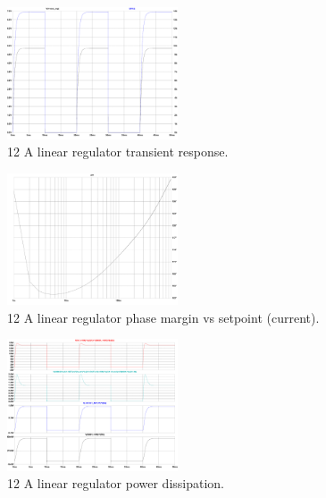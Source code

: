 \section{}\label{sec:hardware_images}
\FloatBarrier
\begin{figure}[h!]
    \centering
    \includegraphics[width=0.45\textwidth]{LT3080-1_Transient-response.pdf}
    \caption{12 A linear regulator transient response.}
    \label{fig:LT3080-1_Transient-response}
\end{figure}

\begin{figure}[h!]
    \centering
    \includegraphics[width=0.45\textwidth]{LT3080-1_Phase-margin_VS_setpoint.pdf}
    \caption{12 A linear regulator phase margin vs setpoint (current).}
    \label{fig:LT3080-1_Phase-margin_VS_setpoint}
\end{figure}

\begin{figure}[h!]
    \centering
    \includegraphics[width=0.45\textwidth]{LT3080-1_PowerDissipation.pdf}
    \caption{12 A linear regulator power dissipation.}
    \label{fig:LT3080-1_PowerDissipation}
\end{figure}

